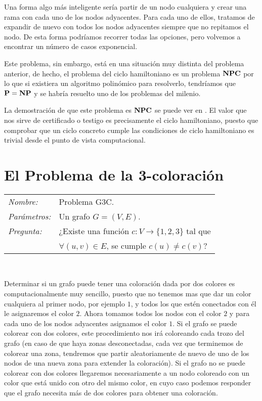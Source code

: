 Una forma algo m\'as inteligente ser\'ia partir de un nodo cualquiera y crear una rama con cada uno de los nodos
adyacentes. Para cada uno de ellos, tratamos de expandir de nuevo con todos los nodos adyacentes siempre que
no repitamos el nodo. De esta forma podr\'iamos recorrer todas las opciones, pero volvemos a
encontrar un n\'umero de casos exponencial.

Este problema, sin embargo, est\'a en una situaci\'on muy distinta del problema anterior,
de hecho, el problema del ciclo hamiltoniano es un problema ${\bf NPC}$ por lo que si existiera un algoritmo
polin\'omico para resolverlo, tendr\'iamos que ${\bf P} = {\bf NP}$ y se habr\'ia resuelto uno de los problemas
del milenio.

La demostraci\'on de que este problema es ${\bf NPC}$ se puede ver en
\cite[Section 34.5.3]{algoBB}. El valor que nos sirve de certificado o testigo es precisamente el ciclo hamiltoniano, puesto que
comprobar que un ciclo concreto cumple las condiciones de ciclo hamiltoniano es trivial desde el punto de vista computacional.

\section{El Problema de la 3-coloración}

\hfil

\begin{tabular}{|ll}
	\textit{Nombre:} & Problema G3C. \\
	\textit{Parámetros:} &Un grafo $G=(V,E)$. \\
	\textit{Pregunta:} & ¿Existe una función
	$c : V \to \{1,2,3\}$ tal que \\ & $\forall (u,v)\in E$, se cumple $c(u)\neq c(v)$? \\
\end{tabular}
\\

\hfil

Determinar si un grafo puede tener una coloraci\'on dada por dos colores es
computacionalmente muy sencillo, puesto que no tenemos
mas que dar un color cualquiera al primer nodo, por ejemplo $1$, y todos los
que est\'en conectados con \'el le asignaremos el color $2$.
Ahora tomamos todos los nodos con el color $2$ y para cada uno de los nodos
adyacentes asignamos el color $1$. Si el grafo se puede colorear
con dos colores, este procedimiento nos ir\'a coloreando cada trozo del grafo
(en caso de que haya zonas desconectadas, cada vez que terminemos de colorear una zona,
tendremos que  partir aleatoriamente de nuevo de uno de los nodos de una nueva
zona para extender la coloraci\'on). Si el grafo no se puede colorear con dos colores
llegaremos necesariamente a un nodo coloreado con un color que est\'a unido con
otro del mismo color, en cuyo caso podemos responder
que el grafo necesita m\'as de dos colores para obtener una coloraci\'on.

